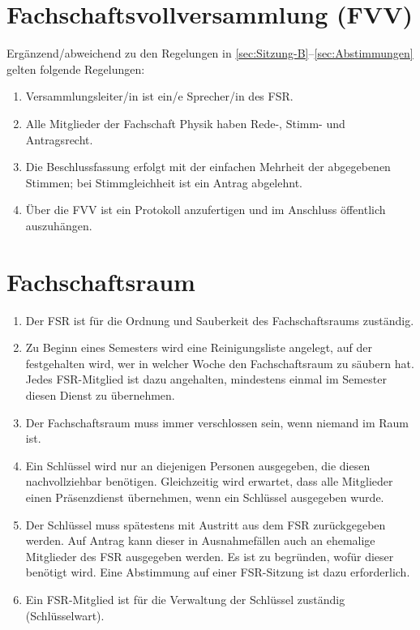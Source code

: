 \documentclass[
	a4paper,
	12pt,
	oneside,
	parskip=half-,
	pagesize,
	headsepline,
	german,
	ngerman
]{scrartcl}
\begin{document}
\section{Fachschaftsvollversammlung (FVV)}
Ergänzend/abweichend zu den Regelungen in \ref{sec:Sitzung-B}--\ref{sec:Abstimmungen} gelten folgende Regelungen:
\begin{enumerate}
	\item Versammlungsleiter/in ist ein/e Sprecher/in des FSR.
	\item Alle Mitglieder der Fachschaft Physik haben Rede-, Stimm- und Antragsrecht.
	\item Die Beschlussfassung erfolgt mit der einfachen Mehrheit der abgegebenen Stimmen; bei Stimmgleichheit ist ein Antrag abgelehnt.
	\item Über die FVV ist ein Protokoll anzufertigen und im Anschluss öffentlich auszuhängen.
\end{enumerate}

\section{Fachschaftsraum}
\label{sec:Fachschaftsraum}
\begin{enumerate}
	\item Der FSR ist für die Ordnung und Sauberkeit des Fachschaftsraums zuständig.
	\item Zu Beginn eines Semesters wird eine Reinigungsliste angelegt, auf der festgehalten wird, wer in welcher Woche den Fachschaftsraum zu säubern hat. Jedes FSR-Mitglied ist dazu angehalten, mindestens einmal im Semester diesen Dienst zu übernehmen.
	\item Der Fachschaftsraum muss immer verschlossen sein, wenn niemand im Raum ist.
	\item Ein Schlüssel wird nur an diejenigen Personen ausgegeben, die diesen nachvollziehbar benötigen. Gleichzeitig wird erwartet, dass alle Mitglieder einen Präsenzdienst übernehmen, wenn ein Schlüssel ausgegeben wurde.
	\item Der Schlüssel muss spätestens mit Austritt aus dem FSR zurückgegeben werden. Auf Antrag kann dieser in Ausnahmefällen auch an ehemalige Mitglieder des FSR ausgegeben werden. Es ist zu begründen, wofür dieser benötigt wird. Eine Abstimmung auf einer FSR-Sitzung ist dazu erforderlich.
	\item Ein FSR-Mitglied ist für die Verwaltung der Schlüssel zuständig (Schlüsselwart).
\end{enumerate}
\end{document}
